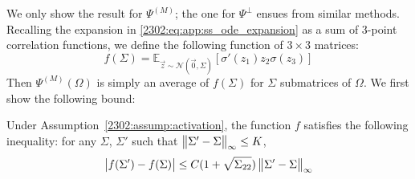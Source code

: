 We only show the result for $\Psi^{(M)}$; the one for $\Psi^\bot$ ensues from similar methods. Recalling the expansion  in \eqref{2302:eq:app:ss_ode_expansion} as a sum of 3-point correlation functions, we define the following function of $3 \times 3$ matrices:
\begin{equation}
    f(\Sigma) = \mathbb{E}_{\vec{z} \sim \mathcal N(\vec{0}, \Sigma)}\left[ \sigma'(z_1)z_2\sigma(z_3) \right]
\end{equation}
Then $\Psi^{(M)}(\Omega)$ is simply an average of $f(\Sigma)$ for $\Sigma$ submatrices of $\Omega$. We first show the following bound:
\begin{lemma}\label{2302:lem:psi_reduced_lipschitz}
    Under Assumption~\ref{2302:assump:activation}, the function $f$ satisfies the following inequality: for any $\Sigma$, $\Sigma'$ such that $\left\lVert \Sigma' - \Sigma\right\rVert_\infty \leq K$,
    \begin{equation}
        \left|f(\Sigma') - f(\Sigma)\right| \leq C(1 + \sqrt{\Sigma_{22}})\left\lVert \Sigma' - \Sigma\right\rVert_\infty
    \end{equation}
\end{lemma}
